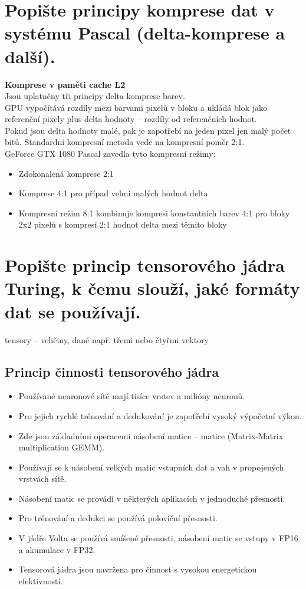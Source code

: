 \section{Popište principy komprese dat v systému Pascal (delta-komprese a další).}
	\textbf{Komprese v paměti cache L2} \\
	Jsou uplatněny tři principy delta komprese barev. \\
	GPU vypočítává rozdíly mezi barvami pixelů v bloku a ukládá blok jako referenční pixely plus delta hodnoty -- rozdíly od referenčních hodnot. \\
	Pokud jsou delta hodnoty malé, pak je zapotřebí na jeden pixel jen malý	počet bitů. Standardní kompresní metoda vede na kompresní poměr 2:1. \\
	GeForce GTX 1080 Pascal zavedla tyto kompresní režimy:
	\begin{itemize}
		\setlength\itemsep{0em}
		\item Zdokonalená komprese 2:1
		\item Komprese 4:1 pro případ velmi malých hodnot delta
		\item Kompresní režim 8:1 kombinuje kompresi konstantních barev 4:1 pro bloky 2x2 pixelů s kompresí 2:1 hodnot delta mezi těmito bloky
	\end{itemize}	
	
	
	
	
\section{Popište princip tensorového jádra Turing, k čemu slouží, jaké formáty dat se používají.}
	tensory -- veličiny, dané např. třemi nebo čtyřmi vektory
	
	\subsection*{Princip činnosti tensorového jádra}
	\begin{itemize}
		\setlength\itemsep{0em}
		\item Používané neuronové sítě mají tisíce vrstev a milióny neuronů.
		\item Pro jejich rychlé trénování a dedukování je zapotřebí vysoký výpočetní výkon.
		\item Zde jsou základními operacemi násobení matice – matice (Matrix-Matrix multiplication GEMM).
		\item Používají se k násobení velkých matic vstupních dat a vah v propojených vrstvách sítě.
		\item Násobení matic se provádí v některých aplikacích v jednoduché přesnosti.
		\item Pro trénování a dedukci se používá poloviční přesnosti.
		\item V jádře Volta se používá smíšené přesnosti, násobení matic se vstupy v FP16 a akumulace v FP32.
		\item Tensorová jádra jsou navržena pro činnost s vysokou energetickou efektivností.
	\end{itemize}

